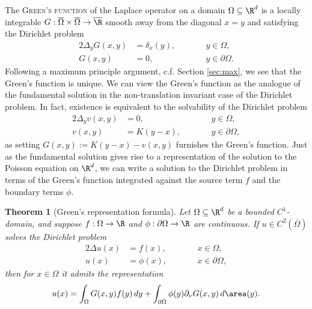 \documentclass[reqno]{amsart}
\newtheorem{theorem}{Theorem}
\theoremstyle{definition}
\theoremstyle{remark}
\renewcommand{\emph}{\textsc}
\begin{document}
The \emph{Green's function} of the Laplace operator on a domain $\Omega \subseteq \R^d$ is a locally integrable $G: \overline\Omega \times \overline\Omega \to \overline\R$ smooth away from the diagonal $x = y$ and satisfying the Dirichlet problem
	\begin{alignat*}{2}
		\Delta_y G(x, y)
			&= \delta_x (y), \qquad  && y \in \Omega, \\
		G(x, y)
			&= 0,					\qquad && y \in \partial \Omega.
	\end{alignat*} 
Following a maximum principle argument, c.f. Section \ref{sec:max}, we see that the Green's function is unique. We can view the Green's function as the analogue of the fundamental solution in the non-translation invariant case of the Dirichlet problem. In fact, existence is equivalent to the solvability of the Dirichlet problem
	\begin{alignat*}{2}
		\Delta_y v(x, y)
			&= 0, \qquad  && y \in \Omega, \\
		v(x, y)
			&= K(y - x),					\qquad && y \in \partial \Omega,
	\end{alignat*} 
as setting $G(x, y) := K(y - x) - v(x, y)$ furnishes the Green's function. Just as the fundamental solution gives rise to a representation of the solution to the Poisson equation on $\R^d$, we can write a solution to the Dirichlet problem in terms of the Green's function integrated against the source term $f$ and the boundary terms $\phi$. 

	
\begin{theorem}[Green's representation formula]
	Let $\Omega \subseteq \R^d$ be a bounded $C^1$-domain, and suppose $f : \Omega \to \R$ and $\phi : \partial \Omega \to \R$ are continuous. If $u \in C^2 (\overline \Omega)$ solves the Dirichlet problem 
		\begin{alignat*}{2}
		\Delta u(x)
			&= f(x), \qquad  && x \in \Omega, \\
		u(x)
			&= \phi(x),					\qquad && x \in \partial \Omega,
	\end{alignat*} 
	then for $x \in \Omega$ it admits the representation
		\[ u(x) = \int_\Omega G(x, y) f(y) \, dy + \int_{\partial \Omega}\phi(y) \partial_\nu G(x, y) \, d\area (y). \]	
\end{theorem}
\end{document}
